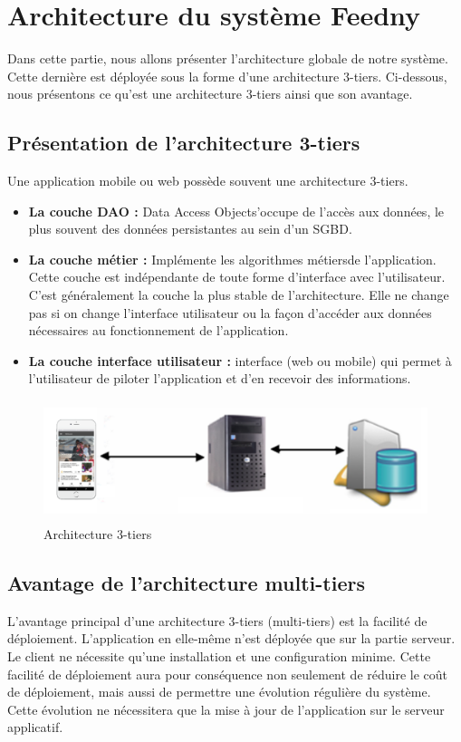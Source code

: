 \section{Architecture du système \textquotedbl Feedny\textquotedbl}
Dans cette partie, nous allons présenter l'architecture globale de notre système. Cette dernière est déployée sous la forme d'une architecture 3-tiers. Ci-dessous, nous présentons ce qu'est une architecture 3-tiers ainsi que son avantage.

\subsection{Présentation de l'architecture 3-tiers}
Une application mobile ou web possède souvent une architecture 3-tiers.
\begin{itemize}
    \item\textbf{La couche DAO : }\textquotedbl Data Access Object\textquotedbl  s'occupe de l'accès aux données, le plus souvent des données persistantes au sein d'un SGBD.\\
    \item\textbf{La couche métier : }Implémente les algorithmes \textquotedbl métiers\textquotedbl  de l'application. Cette couche est indépendante de toute forme d'interface avec l'utilisateur. C'est généralement la couche la plus stable de l'architecture. Elle ne change pas si on change l'interface utilisateur ou la façon d'accéder aux données nécessaires au fonctionnement de l'application.\\
    \item\textbf{La couche interface utilisateur : }interface (web ou mobile) qui permet à l'utilisateur de piloter l'application et d'en recevoir des informations.
\end{itemize}

\begin{figure}[H]
    \centering
    \includegraphics[height=100pt,width=400pt]{img/chapter3/tiers.png}
    \caption{Architecture 3-tiers}
\end{figure}

\subsection{Avantage de l'architecture multi-tiers}
L'avantage principal d'une architecture 3-tiers (multi-tiers) est la facilité de déploiement. L'application
en elle-même n'est déployée que sur la partie serveur. Le client ne nécessite qu'une installation et une configuration minime. Cette facilité de déploiement aura pour conséquence non seulement de réduire le coût de déploiement, mais aussi de permettre une évolution régulière du système. Cette évolution ne nécessitera que la mise à jour de l'application sur le serveur applicatif.

